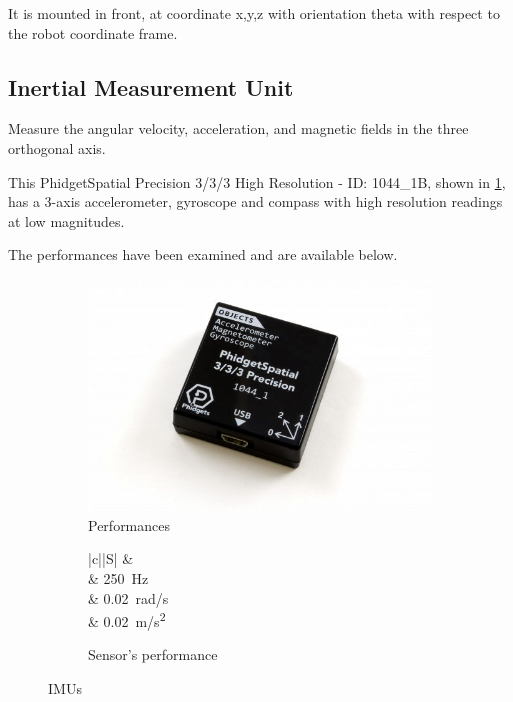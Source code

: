 It is mounted in front, at coordinate x,y,z with orientation theta with respect to the robot coordinate frame.

\subsection{Inertial Measurement Unit}

\noindent Measure the angular velocity, acceleration, and magnetic fields in the three orthogonal axis.

This PhidgetSpatial Precision 3/3/3 High Resolution - ID: 1044\_1B, shown in \ref{fig:spatial}, has a 3-axis accelerometer, gyroscope and compass with high resolution readings at low magnitudes.

The performances have been examined and are available below.

\begin{figure}[!ht]
	\begin{center}
		\begin{subfigure}[b]{.5\textwidth}
			\begin{center}
				\includegraphics[width=1\textwidth]{Images/4-Methods/1044_1B.jpg}
			\end{center}
			\caption{Performances}
			\label{fig:spatial}
		\end{subfigure}
		\begin{subfigure}[b]{.45\textwidth}
			\begin{center}
				\label{tab:evalPhiIMU}
				\begin{tabular}{|c||S|}
					\hline
					 &   \\
					\hline
					\hline
					 &  \SI{250}{Hz} \\
					\hline
					\centering{$\boldsymbol \eta_{\omega}$} & \SI{0.02}{\radian/\second} \\
					\hline
					 & \SI{0.02}{\meter/\second \squared} \\
					\hline
				\end{tabular}
				\caption{Sensor's performance}
			\end{center}
		\end{subfigure}%
		\caption{\glspl{IMU}}
		\label{fig:imusensorphi}
	\end{center}
\end{figure}

